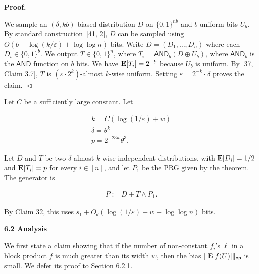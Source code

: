 


\par\medskip\noindent\textbf{
\textbf{Proof}.}\par




We sample an $(\delta,kb)$-biased distribution $D$ on $\{0,1\}^{nb}$ and $b$ uniform bits $U_{b}$.
By standard construction [41, 2], $D$ can be sampled using $O(b+\log(k/\varepsilon)+\log\log n)$ bits.
Write $D=(D_{1},\ldots,D_{n})$ where each $D_{i}\in\{0,1\}^{b}$.
We output $T\in\{0,1\}^{n}$, where $T_{i}=\mathsf{AND}_{b}(D\oplus U_{b})$, where $\mathsf{AND}_{b}$ is the $\mathsf{AND}$ function on $b$ bits.
We have $\mathop{\bf E\/}[T_{i}]=2^{-b}$ because $U_{b}$ is uniform.
By [37, Claim 3.7], $T$ is $(\varepsilon\cdot 2^{k})$-almost $k$-wise uniform.
Setting $\varepsilon=2^{-k}\cdot\delta$ proves the claim.
$\vartriangleleft$\par




Let $C$ be a sufficiently large constant.
Let\par


\[\begin{gathered}
\displaystyle k \displaystyle=C(\log(1/\varepsilon)+w) \\
\displaystyle\delta \displaystyle=\theta^{k} \\
\displaystyle p \displaystyle=2^{-23w}\theta^{3}.
\end{gathered}\]


Let $D$ and $T$ be two $\delta$-almost $k$-wise independent distributions, with $\mathop{\bf E\/}[D_{i}]=1/2$ and $\mathop{\bf E\/}[T_{i}]=p$ for every $i\in[n]$, and let $P_{1}$ be the PRG given by the theorem.
The generator is\par


\[\begin{gathered}
P:=D+T\wedge P_{1}.
\end{gathered}\]


By Claim 32, this uses $s_{1}+O_{\theta}(\log(1/\varepsilon)+w+\log\log n)$ bits.\par






\par\medskip\noindent\textbf{
6.2 Analysis}\par




We first state a claim showing that if the number of non-constant $f_{i}$’s $\ell$ in a block product $f$ is much greater than its width $w$, then the bias $\lVert\mathop{\bf E\/}[f(U)]\rVert_{\mathsf{op}}$ is small.
We defer its proof to Section 6.2.1.\par



